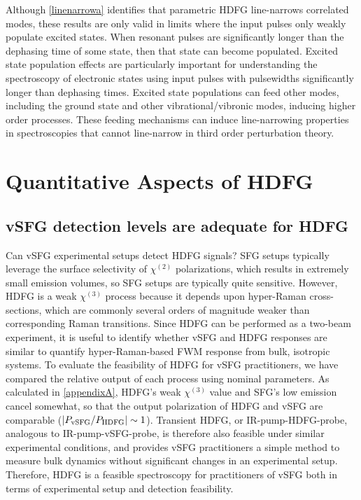 \documentclass[aip, jcp, reprint, onecolumn, nofootinbib]{revtex4-2}
\begin{document}
Although \autoref{linenarrowa} identifies that parametric HDFG line-narrows correlated modes, these results are only valid in limits where the input pulses only weakly populate excited states.
When resonant pulses are significantly longer than the dephasing time of some state, then that state can become populated.
Excited state population effects are particularly important for understanding the spectroscopy of electronic states using input pulses with pulsewidths significantly longer than dephasing times. \cite{RN471, Yurs2012}
Excited state populations can feed other modes, including the ground state and other vibrational/vibronic modes, inducing higher order processes.\cite{RN471}
These feeding mechanisms can induce line-narrowing properties in spectroscopies that cannot line-narrow in third order perturbation theory.\cite{RN471, RN410}

\section{Quantitative Aspects of HDFG}\label{quant}

\subsection{vSFG detection levels are adequate for HDFG}
Can vSFG experimental setups detect HDFG signals?
SFG setups typically leverage the surface selectivity of $\chi^{(2)}$ polarizations, which results in extremely small emission volumes, so SFG setups are typically quite sensitive.
However, HDFG is a weak $\chi^{(3)}$ process because it depends upon hyper-Raman cross-sections, which are commonly several orders of magnitude weaker than corresponding Raman transitions.\cite{RN515}
Since HDFG can be performed as a two-beam experiment, it is useful to identify whether vSFG and HDFG responses are similar to quantify hyper-Raman-based FWM response from bulk, isotropic systems.
To evaluate the feasibility of HDFG for vSFG practitioners, we have compared the relative output of each process using nominal parameters. 
As calculated in \autoref{appendixA}, HDFG's weak $\chi^{(3)}$ value and SFG's low emission cancel somewhat, so that the output polarization of HDFG and vSFG are comparable ($\abs{P_\text{vSFG} / P_\text{HDFG}} \sim 1$).
Transient HDFG, or IR-pump-HDFG-probe, analogous to IR-pump-vSFG-probe, is therefore also feasible under similar experimental conditions, and provides vSFG practitioners a simple method to measure bulk dynamics without significant changes in an experimental setup. 
Therefore, HDFG is a feasible spectroscopy for practitioners of vSFG both in terms of experimental setup and detection feasibility.
\end{document}
